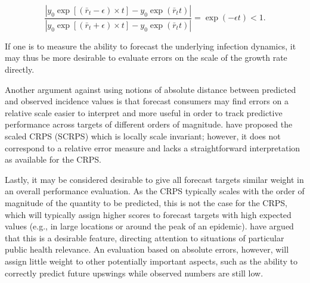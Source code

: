 \documentclass{article}
\begin{document}
\begin{linenomath*}
\begin{equation}
\frac{\left|y_0 \exp[(\bar{r}_t - \epsilon) \times t] - y_0 \exp(\bar{r}_t t)\right|}{\left| y_0 \exp[(\bar{r}_t + \epsilon) \times t] - y_0 \exp(\bar{r}_t t) \right|} = \exp(-\epsilon t) < 1.
\end{equation}
\end{linenomath*}

If one is to measure the ability to forecast the underlying infection dynamics, it may thus be more desirable to evaluate errors on the scale of the growth rate directly.

Another argument against using notions of absolute distance between predicted and observed incidence values is that forecast consumers may find errors on a relative scale easier to interpret and more useful in order to track predictive performance across targets of different orders of magnitude. 
\cite{bolinLocalScaleInvariance2021} have proposed the scaled CRPS (SCRPS) which is locally scale invariant; however, it does not correspond to a relative error measure and lacks a straightforward interpretation as available for the CRPS. 

Lastly, it may be considered desirable to give all forecast targets similar weight in an overall performance evaluation. As the CRPS typically scales with the order of magnitude of the quantity to be predicted, this is not the case for the CRPS, which will typically assign higher scores to forecast targets with high expected values (e.g., in large locations or around the peak of an epidemic). \cite{bracherEvaluatingEpidemicForecasts2021} have argued that this is a desirable feature, directing attention to situations of particular public health relevance. An evaluation based on absolute errors, however, will assign little weight to other potentially important aspects, such as the ability to correctly predict future upswings while observed numbers are still low. 
\end{document}
